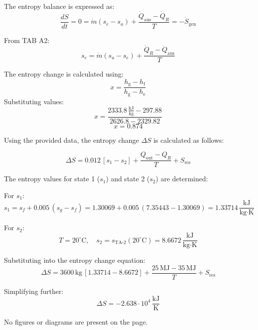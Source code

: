 The entropy balance is expressed as:  
\[
\frac{dS}{dt} = 0 = \dot{m} \left( s_e - s_a \right) + \frac{\dot{Q}_{\text{aus}} - \dot{Q}_R}{T} = -\dot{S}_{\text{gen}}
\]  

From TAB A2:  
\[
s_e = \dot{m} \left( s_a - s_e \right) + \frac{\dot{Q}_R - \dot{Q}_{\text{aus}}}{T}
\]  

The entropy change is calculated using:  
\[
x = \frac{h_{\text{g}} - h_{\text{f}}}{h_{\text{g}} - h_{\text{e}}}
\]  
Substituting values:  
\[
x = \frac{2333.8 \, \frac{\text{kJ}}{\text{kg}} - 297.88}{2626.8 - 2329.82}
\]  
\[
x = 0.874
\]

Using the provided data, the entropy change \( \Delta S \) is calculated as follows:  

\[
\Delta S = 0.012 \, [s_1 - s_2] + \frac{Q_{\text{out}} - Q_R}{T} + S_{\text{res}}
\]

The entropy values for state 1 (\( s_1 \)) and state 2 (\( s_2 \)) are determined:  

For \( s_1 \):  
\[
s_1 = s_f + 0.005 \, (s_g - s_f) = 1.30069 + 0.005 \, (7.35443 - 1.30069) = 1.33714 \, \frac{\text{kJ}}{\text{kg·K}}
\]

For \( s_2 \):  
\[
T = 20^\circ\text{C}, \quad s_2 = s_{\text{TA-2}}(20^\circ\text{C}) = 8.6672 \, \frac{\text{kJ}}{\text{kg·K}}
\]

Substituting into the entropy change equation:  
\[
\Delta S = 3600 \, \text{kg} \, \left[ 1.33714 - 8.6672 \right] + \frac{25 \, \text{MJ} - 35 \, \text{MJ}}{T} + S_{\text{res}}
\]

Simplifying further:  
\[
\Delta S = -2.638 \cdot 10^4 \, \frac{\text{kJ}}{\text{K}}
\]  

No figures or diagrams are present on the page.